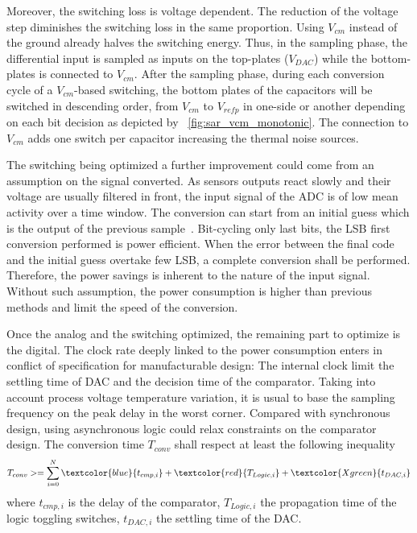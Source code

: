 Moreover, the switching loss is voltage dependent. The reduction of the voltage step diminishes the switching loss in the same proportion. Using  \(V_{cm}\) instead of the ground already halves the switching energy. Thus, in the sampling phase, the differential input is sampled as inputs on the top-plates (\(V_{DAC}\)) while the bottom-plates is connected to \(V_{cm}\). After the sampling phase, during each conversion cycle of a \(V_{cm}\)-based switching, the bottom plates of the capacitors will be switched in descending order, from \(V_{cm}\) to \(V_{refp}\) in one-side or another depending on each bit decision as depicted by \figurename~\ref{fig:sar_vcm_monotonic}. The connection to \(V_{cm}\) adds one switch per capacitor increasing the thermal noise sources.

The switching being optimized a further improvement could come from an assumption on the signal converted. As sensors outputs react slowly and their voltage are usually filtered in front, the input signal of the ADC is of low mean activity over a time window. The conversion can start from an initial guess which is the output of the previous sample~\cite{Yaul2014}. Bit-cycling only last bits, the LSB first conversion performed is power efficient. When the error between the final code and the initial guess overtake few LSB, a complete conversion shall be performed. Therefore, the power savings is inherent to the nature of the input signal. Without such assumption, the power consumption is higher than previous methods and limit the speed of the conversion.

Once the analog and the switching optimized, the remaining part to optimize is the digital. The clock rate deeply linked to the power consumption enters in conflict of specification for manufacturable design: The internal clock limit the settling time of DAC and the decision time of the comparator. Taking into account process voltage temperature variation, it is usual to base the sampling frequency on the peak delay in the worst corner. Compared with synchronous design, using asynchronous logic could relax constraints on the comparator design. The conversion time \(T_{conv}  \) shall respect at least the following inequality
\begin{equation}
\label{eqn:sar_async_conv}
T_{conv} >= \sum_{i=0}^N {\textcolor{blue}{t_{cmp, i}}+\textcolor{red}{T_{Logic, i}}+\textcolor{Xgreen}{t_{DAC, i}}}
\end{equation}
where \(t_{cmp, i}\) is the delay of the comparator, \(T_{Logic, i}\) the propagation time of the logic toggling switches, \(t_{DAC, i}\) the settling time of the DAC\@.

